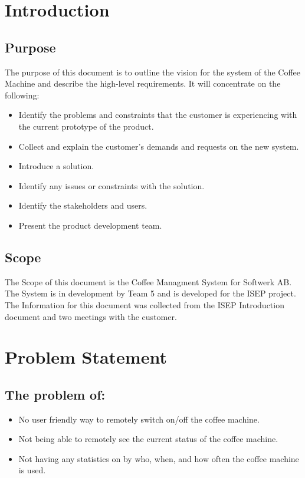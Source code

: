 \section{Introduction}

\subsection{Purpose}

The purpose of this document is to outline the vision for the system of the Coffee Machine and describe the high-level requirements. It will concentrate on the following:

\begin{itemize}

\item Identify the problems and constraints that the customer is experiencing with the current prototype of the product.
\item Collect and explain the customer’s demands and requests on the new system.
\item Introduce a solution.
\item Identify any issues or constraints with the solution.
\item Identify the stakeholders and users.
\item Present the product development team.

\end{itemize}

\subsection{Scope}

The Scope of this document is the Coffee Managment System for Softwerk AB. The System is in development by Team 5 and is developed for the ISEP project. The Information for this document was collected from the ISEP Introduction document and two meetings with the customer.

\clearpage

\section{Problem Statement}

\subsection{The problem of:}

\begin{itemize}
\item No user friendly way to remotely switch on/off the coffee machine.
\item Not being able to remotely see the current status of the coffee machine.
\item Not having any statistics on by who, when, and how often the coffee machine is used.
\end{itemize}

